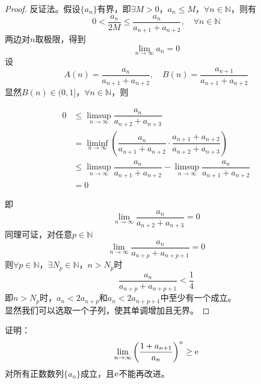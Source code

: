 \begin{proof}
    
    反证法。假设$\{a_n\}$有界，即$\exists M > 0$，$a_n \leq M$，$\forall n \in \mathbb{N}$，则有
    $$0 < \dfrac{a_n}{2M} \leq \dfrac{a_n}{a_{n + 1} + a_{n + 2}}, \quad \forall n \in \mathbb{N}$$
    两边对$n$取极限，得到
    $$\lim\limits_{n \to \infty}{a_n} = 0$$
    设
    $$A(n) = \dfrac{a_n}{a_{n + 1} + a_{n + 2}}, \quad B(n) = \dfrac{a_{n + 1}}{a_{n + 1} + a_{n + 2}}$$
    显然$B(n) \in (0, 1]$，$ \forall n \in \mathbb{N}$，则
    
    \begin{align*}
        0 & \leq \limsup_{n \to \infty}{\dfrac{a_n}{a_{n + 2} + a_{n + 3}}} \\
        & = \liminf_{n \to \infty}{\left( \dfrac{a_n}{a_{n + 1} + a_{n + 2}} \cdot \dfrac{a_{n + 1} + a_{n + 2}}{a_{n + 2} + a_{n + 3}} \right)} \\
        & \leq \limsup_{n \to \infty}{\dfrac{a_n}{a_{n + 1} + a_{n + 2}}} - \limsup_{n \to \infty}{\dfrac{a_n}{a_{n + 1} + a_{n + 2}}} \\
        & = 0
    \end{align*}
    
    即
    $$\lim\limits_{n \to \infty}{\dfrac{a_n}{a_{n + 2} + a_{n + 3}}} = 0$$
    同理可证，对任意$p \in \mathbb{N}$
    $$\lim\limits_{n \to \infty}{\dfrac{a_n}{a_{n + p} + a_{n + p + 1}}} = 0$$
    则$\forall p \in \mathbb{N}$，$\exists N_p \in \mathbb{N}$，$n > N_p$时
    $$\dfrac{a_n}{a_{n + p} + a_{n + p + 1}} < \dfrac{1}{4}$$
    即$n > N_p$时，$a_n < 2a_{n + p}$和$a_n < 2a_{n + p + 1}$中至少有一个成立。\\
    显然我们可以选取一个子列，使其单调增加且无界。
    
\end{proof}

\begin{proposition}

    证明：
    $$\lim\limits_{n \to \infty}{\left( \dfrac{1 + a_{n + 1}}{a_n} \right)^n} \geq \mathrm{e}$$
    对所有正数数列$\{a_n\}$成立，且$\mathrm{e}$不能再改进。

\end{proposition}

